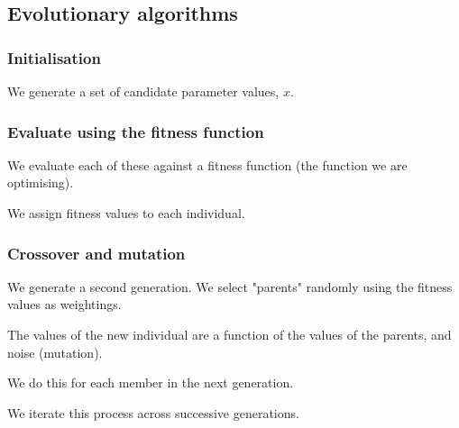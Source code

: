 
\subsection{Evolutionary algorithms}

\subsubsection{Initialisation}

We generate a set of candidate parameter values, \(x\).

\subsubsection{Evaluate using the fitness function}

We evaluate each of these against a fitness function (the function we are optimising).

We assign fitness values to each individual.

\subsubsection{Crossover and mutation}

We generate a second generation. We select "parents" randomly using the fitness values as weightings.

The values of the new individual are a function of the values of the parents, and noise (mutation).

We do this for each member in the next generation.

We iterate this process across successive generations.

